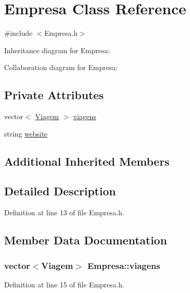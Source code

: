 \hypertarget{class_empresa}{\section{Empresa Class Reference}
\label{class_empresa}
}


{\ttfamily \#include $<$Empresa.\+h$>$}



Inheritance diagram for Empresa\+:


Collaboration diagram for Empresa\+:
\subsection*{Private Attributes}
\begin{DoxyCompactItemize}
\item 
vector$<$ \hyperlink{class_viagem}{Viagem} $>$ \hyperlink{class_empresa_a922a041abeb39daf38135963dbe821f5}{viagens}
\item 
string \hyperlink{class_empresa_a809624b98d1db18f8627ce2fa394dddd}{website}
\end{DoxyCompactItemize}
\subsection*{Additional Inherited Members}


\subsection{Detailed Description}


Definition at line 13 of file Empresa.\+h.



\subsection{Member Data Documentation}
\hypertarget{class_empresa_a922a041abeb39daf38135963dbe821f5}{
\subsubsection[{viagens}]{\setlength{\rightskip}{0pt plus 5cm}vector$<${\bf Viagem}$>$ Empresa\+::viagens\hspace{0.3cm}{\ttfamily [private]}}}\label{class_empresa_a922a041abeb39daf38135963dbe821f5}


Definition at line 15 of file Empresa.\+h.

